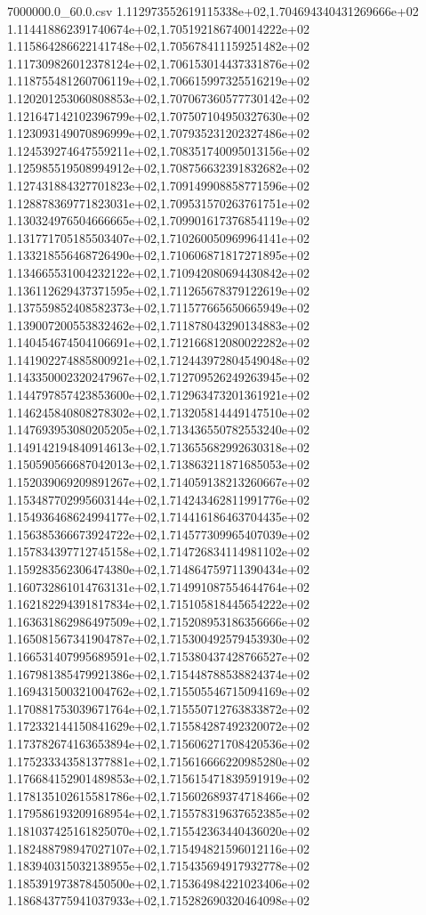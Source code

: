 \begin{filecontents*}{7000000.0_60.0.csv}
1.112973552619115338e+02,1.704694340431269666e+02
1.114418862391740674e+02,1.705192186740014222e+02
1.115864286622141748e+02,1.705678411159251482e+02
1.117309826012378124e+02,1.706153014437331876e+02
1.118755481260706119e+02,1.706615997325516219e+02
1.120201253060808853e+02,1.707067360577730142e+02
1.121647142102396799e+02,1.707507104950327630e+02
1.123093149070896999e+02,1.707935231202327486e+02
1.124539274647559211e+02,1.708351740095013156e+02
1.125985519508994912e+02,1.708756632391832682e+02
1.127431884327701823e+02,1.709149908858771596e+02
1.128878369771823031e+02,1.709531570263761751e+02
1.130324976504666665e+02,1.709901617376854119e+02
1.131771705185503407e+02,1.710260050969964141e+02
1.133218556468726490e+02,1.710606871817271895e+02
1.134665531004232122e+02,1.710942080694430842e+02
1.136112629437371595e+02,1.711265678379122619e+02
1.137559852408582373e+02,1.711577665650665949e+02
1.139007200553832462e+02,1.711878043290134883e+02
1.140454674504106691e+02,1.712166812080022282e+02
1.141902274885800921e+02,1.712443972804549048e+02
1.143350002320247967e+02,1.712709526249263945e+02
1.144797857423853600e+02,1.712963473201361921e+02
1.146245840808278302e+02,1.713205814449147510e+02
1.147693953080205205e+02,1.713436550782553240e+02
1.149142194840914613e+02,1.713655682992630318e+02
1.150590566687042013e+02,1.713863211871685053e+02
1.152039069209891267e+02,1.714059138213260667e+02
1.153487702995603144e+02,1.714243462811991776e+02
1.154936468624994177e+02,1.714416186463704435e+02
1.156385366673924722e+02,1.714577309965407039e+02
1.157834397712745158e+02,1.714726834114981102e+02
1.159283562306474380e+02,1.714864759711390434e+02
1.160732861014763131e+02,1.714991087554644764e+02
1.162182294391817834e+02,1.715105818445654222e+02
1.163631862986497509e+02,1.715208953186356666e+02
1.165081567341904787e+02,1.715300492579453930e+02
1.166531407995689591e+02,1.715380437428766527e+02
1.167981385479921386e+02,1.715448788538824374e+02
1.169431500321004762e+02,1.715505546715094169e+02
1.170881753039671764e+02,1.715550712763833872e+02
1.172332144150841629e+02,1.715584287492320072e+02
1.173782674163653894e+02,1.715606271708420536e+02
1.175233343581377881e+02,1.715616666220985280e+02
1.176684152901489853e+02,1.715615471839591919e+02
1.178135102615581786e+02,1.715602689374718466e+02
1.179586193209168954e+02,1.715578319637652385e+02
1.181037425161825070e+02,1.715542363440436020e+02
1.182488798947027107e+02,1.715494821596012116e+02
1.183940315032138955e+02,1.715435694917932778e+02
1.185391973878450500e+02,1.715364984221023406e+02
1.186843775941037933e+02,1.715282690320464098e+02

\end{filecontents*}
